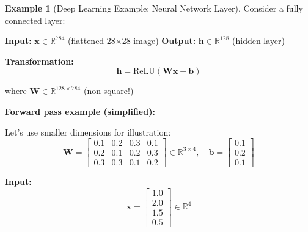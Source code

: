 \documentclass[12pt,a4paper]{article}
\theoremstyle{definition}
\newtheorem{example}{Example}[section]
\begin{document}
\begin{example}[Deep Learning Example: Neural Network Layer]
Consider a fully connected layer:

\textbf{Input:} $\mathbf{x} \in \mathbb{R}^{784}$ (flattened 28×28 image)
\textbf{Output:} $\mathbf{h} \in \mathbb{R}^{128}$ (hidden layer)

\textbf{Transformation:}
\begin{equation}
\mathbf{h} = \text{ReLU}(\mathbf{W}\mathbf{x} + \mathbf{b})
\end{equation}

where $\mathbf{W} \in \mathbb{R}^{128 \times 784}$ (non-square!)

\textbf{Forward pass example (simplified):}

Let's use smaller dimensions for illustration:
\begin{equation}
\mathbf{W} = \begin{bmatrix}
0.1 & 0.2 & 0.3 & 0.1 \\
0.2 & 0.1 & 0.2 & 0.3 \\
0.3 & 0.3 & 0.1 & 0.2
\end{bmatrix} \in \mathbb{R}^{3 \times 4}, \quad
\mathbf{b} = \begin{bmatrix} 0.1 \\ 0.2 \\ 0.1 \end{bmatrix}
\end{equation}

\textbf{Input:}
\begin{equation}
\mathbf{x} = \begin{bmatrix} 1.0 \\ 2.0 \\ 1.5 \\ 0.5 \end{bmatrix} \in \mathbb{R}^4
\end{equation}


\end{example}
\end{document}
